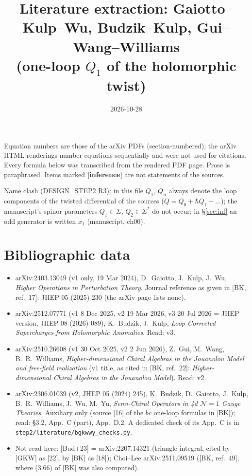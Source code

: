 \documentclass[10pt]{article}
\title{Literature extraction: Gaiotto--Kulp--Wu, Budzik--Kulp, Gui--Wang--Williams\\(one-loop $Q_1$ of the holomorphic twist)}
\date{2026-10-28}
\begin{document}
\small
\maketitle

\noindent Equation numbers are those of the arXiv PDFs (section-numbered); the arXiv HTML renderings number equations sequentially and were not used for citations. Every formula below was transcribed from the rendered PDF page. Prose is paraphrased. Items marked \textbf{[inference]} are not statements of the sources.

\noindent Name clash (DESIGN\_STEP2 R3): in this file $Q_1$, $Q_n$ always denote the loop components of the twisted differential of the sources ($Q=Q_0+\hbar Q_1+\dots$); the manuscript's spinor parameters $Q_1\in\Sigma$, $Q_2\in\Sigma^*$ do not occur; in \S\ref{sec:inf} an odd generator is written $x_1$ (manuscript, ch00).

\section{Bibliographic data}
\begin{itemize}
\item[{[GKW]}] arXiv:2403.13049 (v1 only, 19 Mar 2024), D.~Gaiotto, J.~Kulp, J.~Wu, \emph{Higher Operations in Perturbation Theory}. Journal reference as given in [BK, ref.~17]: JHEP 05 (2025) 230 (the arXiv page lists none).
\item[{[BK]}] arXiv:2512.07771 (v1 8 Dec 2025, v2 19 Mar 2026, v3 20 Jul 2026 = JHEP version, JHEP 08 (2026) 089), K.~Budzik, J.~Kulp, \emph{Loop Corrected Supercharges from Holomorphic Anomalies}. Read: v3.
\item[{[GWW]}] arXiv:2510.26608 (v1 30 Oct 2025, v2 2 Jun 2026), Z.~Gui, M.~Wang, B.~R.~Williams, \emph{Higher-dimensional Chiral Algebras in the Jouanolou Model and free-field realization} (v1 title, as cited in [BK, ref.~22]: \emph{Higher-dimensional Chiral Algebras in the Jouanolou Model}). Read: v2.
\item[{[BGKWWY]}] arXiv:2306.01039 (v2, JHEP 05 (2024) 245), K.~Budzik, D.~Gaiotto, J.~Kulp, B.~R.~Williams, J.~Wu, M.~Yu, \emph{Semi-Chiral Operators in 4d $\mathcal N=1$ Gauge Theories}. Auxiliary only (source [16] of the $bc$ one-loop formulas in [BK]); read: \S3.2, App.~C (part), App.~D.2. A dedicated check of its App.~C is in \texttt{step2/literature/bgkwwy\_checks.py}.
\item Not read here: [Bud+23] = arXiv:2207.14321 (triangle integral, cited by [GKW] as [22], by [BK] as [18]); Choi--Lee arXiv:2511.09519 ([BK, ref.~49], where (3.66) of [BK] was also computed).
\end{itemize}
\end{document}
